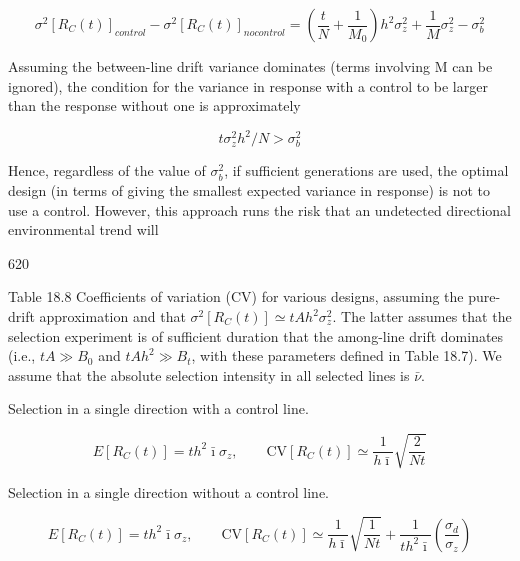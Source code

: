 \documentclass{article}
\begin{document}
\begin{equation}
\sigma^{2}\left[R_{C}(t)\right]_{control}-\sigma^{2}\left[R_{C}(t)\right]_{no control}=\left(\frac{t}{N}+\frac{1}{M_{0}}\right)h^{2}\sigma_{z}^{2}+\frac{1}{M}\sigma_{z}^{2}-\sigma_{b}^{2}
\tag{18.31a}
\label{eq:18_31a}
\end{equation}

Assuming the between-line drift variance dominates (terms involving M can be ignored), the condition for the variance in response with a control to be larger than the response without one is approximately

\begin{equation}
t\sigma_{z}^{2}h^{2}/N>\sigma_{b}^{2}
\tag{18.31b}
\label{eq:18_31b}
\end{equation}

Hence, regardless of the value of  $ \sigma_{b}^{2} $, if sufficient generations are used, the optimal design (in terms of giving the smallest expected variance in response) is not to use a control. However, this approach runs the risk that an undetected directional environmental trend will

620

Table 18.8 Coefficients of variation (CV) for various designs, assuming the pure-drift approximation and that  $ \sigma^2[R_C(t)] \simeq t A h^2 \sigma_z^2 $. The latter assumes that the selection experiment is of sufficient duration that the among-line drift dominates (i.e.,  $ t A \gg B_0 $ and  $ t A h^2 \gg B_t $, with these parameters defined in Table 18.7). We assume that the absolute selection intensity in all selected lines is  $ \bar{\nu} $.

Selection in a single direction with a control line.

\begin{equation}
E\left[R_{C}(t)\right]=t h^{2}\bar{\imath}\sigma_{z},\qquad\mathrm{C V}\left[R_{C}(t)\right]\simeq\frac{1}{h\bar{\imath}}\sqrt{\frac{2}{N t}}
\tag{18.32a}
\label{eq:18_32a}
\end{equation}

Selection in a single direction without a control line.

\begin{equation}
E\left[R_{C}(t)\right]=t h^{2}\bar{\imath}\sigma_{z},\qquad\mathrm{C V}\left[R_{C}(t)\right]\simeq\frac{1}{h\bar{\imath}}\sqrt{\frac{1}{N t}}+\frac{1}{t h^{2}\bar{\imath}}\left(\frac{\sigma_{d}}{\sigma_{z}}\right)
\tag{18.32b}
\label{eq:18_32b}
\end{equation}
\end{document}
